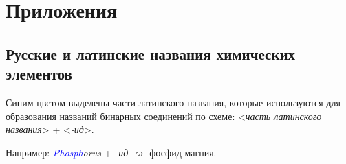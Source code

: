 \appendix
\renewcommand{\thesection}{\Alph{section}}
\pagestyle{empty}

\chapter{Приложения}


\section{Русские и латинские названия химических элементов}\label{appendix:Russian_and_Latin_names_of_chemical_elements}

{\small Синим цветом выделены части латинского названия, которые используются для образования названий бинарных соединений по схеме: <\textit{часть латинского названия}> + <\textit{-ид}>.

Например:  \textit{\textcolor{blue}{Phosph}orus} + \textit{-ид} $\rightsquigarrow$ фосфид магния.}

